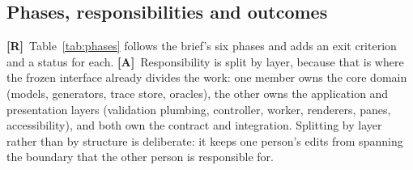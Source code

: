 \documentclass[11pt,a4paper]{article}
\newcommand{\R}{\textcolor{reqc}{\textbf{[R]}}}     %
\newcommand{\A}{\textcolor{asmc}{\textbf{[A]}}}     %
\begin{document}
\subsection{Phases, responsibilities and outcomes}

\R\ Table~\ref{tab:phases} follows the brief's six phases and adds an exit criterion and a
status for each. \A\ Responsibility is split by layer, because that is where the frozen
interface already divides the work: one member owns the core domain (models, generators,
trace store, oracles), the other owns the application and presentation layers (validation
plumbing, controller, worker, renderers, panes, accessibility), and both own the contract and
integration. Splitting by layer rather than by structure is deliberate: it keeps one person's
edits from spanning the boundary that the other person is responsible for.
\end{document}
